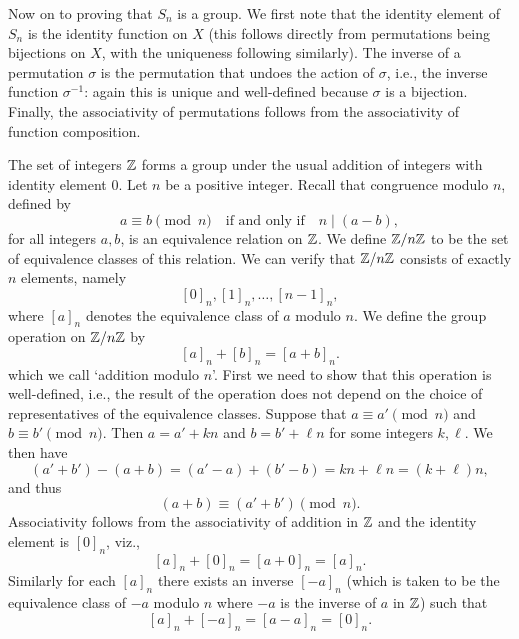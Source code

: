 \begin{example}
    Now on to proving that \(S_n\) is a group. We first note that the identity
    element of \(S_n\) is the identity function on \(X\) (this follows directly
    from permutations being bijections on \(X\), with the uniqueness following
    similarly). The inverse of a permutation \(\sigma\) is the permutation that
    undoes the action of \(\sigma\), i.e., the inverse function \(\sigma^{-1}\):
    again this is unique and well-defined because \(\sigma\) is a bijection.
    Finally, the associativity of permutations follows from the associativity of
    function composition.
\end{example}

\begin{example}[\(\Z\) and \(\Z/n\Z\)]
    \label{def:z-and-zmodn}
    The set of integers \(\Z\) forms a group under the usual addition of
    integers with identity element \(0\). Let \(n\) be a positive integer.
    Recall that congruence modulo \(n\), defined by
    \[
        a \equiv b \pmod{n} \quad \text{if and only if} \quad n \mid (a - b),
    \]
    for all integers \(a, b\), is an equivalence relation on \(\Z\). We define
    \(\Z/n\Z\) to be the set of equivalence classes of this relation. We can
    verify that \(\Z/n\Z\) consists of exactly \(n\) elements, namely
    \[
        [0]_n, [1]_n, \ldots, [n - 1]_n,
    \]
    where \([a]_n\) denotes the equivalence class of \(a\) modulo \(n\). We
    define the group operation on \(\Z/n\Z\) by
    \[
        [a]_n + [b]_n = [a + b]_n.
    \]
    which we call `addition modulo \(n\)'.  First we need to show that this
    operation is well-defined, i.e., the result of the operation does not depend
    on the choice of representatives of the equivalence classes. Suppose that
    \(a \equiv a' \pmod{n}\) and \(b \equiv b' \pmod{n}\). Then \(a = a' + kn\)
    and \(b = b' + \ell n\) for some integers \(k, \ell\). We then have
    \[
        (a' + b') - (a + b) = (a' - a) + (b' - b) = kn + \ell n = (k + \ell)n,
    \]
    and thus
    \[
        (a + b) \equiv (a' + b') \pmod{n}.
    \]
    Associativity follows from the associativity of addition in \(\Z\) and the
    identity element is \([0]_n\), viz.,
    \[
        [a]_n + [0]_n = [a + 0]_n = [a]_n.
    \]
    Similarly for each \([a]_n\) there exists an inverse \([-a]_n\) (which is
    taken to be the equivalence class of \(-a\) modulo \(n\) where \(-a\) is the
    inverse of \(a\) in \(\Z\)) such that
    \[
        [a]_n + [-a]_n = [a - a]_n = [0]_n.
    \]
\end{example}

